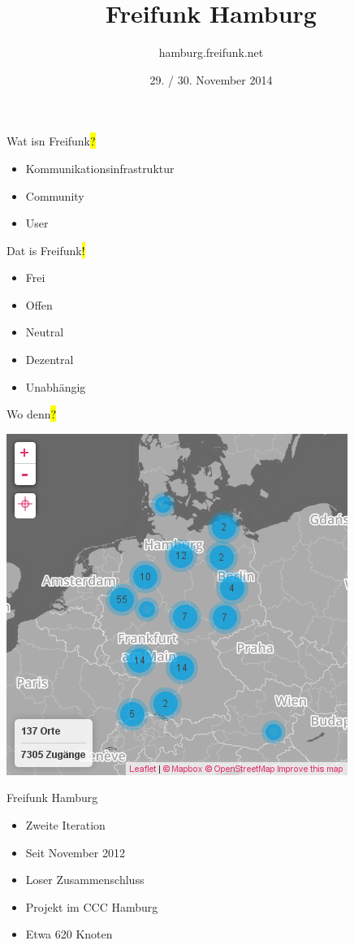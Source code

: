 \documentclass[t]{beamer}
\title{Freifunk Hamburg}
\author{hamburg.freifunk.net}
\date{29. / 30. November 2014}
\begin{document}
\maketitle

\begin{frame}{Wat isn Freifunk\hl{?}}
    \begin{itemize}
        \item Kommunikationsinfrastruktur
        \item Community
        \item User
    \end{itemize}
\end{frame}

\begin{frame}{Dat is Freifunk\hl{!}}
    \begin{itemize}
        \item Frei
        \item Offen
        \item Neutral
        \item Dezentral
        \item Unabhängig
    \end{itemize}
\end{frame}

\begin{frame}{Wo denn\hl{?}}
    \begin{center}
        \includegraphics[width=.5\textwidth]{Bilder/community-map-2014-11-29}
    \end{center}
\end{frame}

\begin{frame}{Freifunk Hamburg\ANKER{}}
    \begin{itemize}
        \item Zweite Iteration
        \item Seit November 2012
        \item Loser Zusammenschluss
        \item Projekt im CCC Hamburg
        \item Etwa 620 Knoten
    \end{itemize}
\end{frame}
\end{document}
